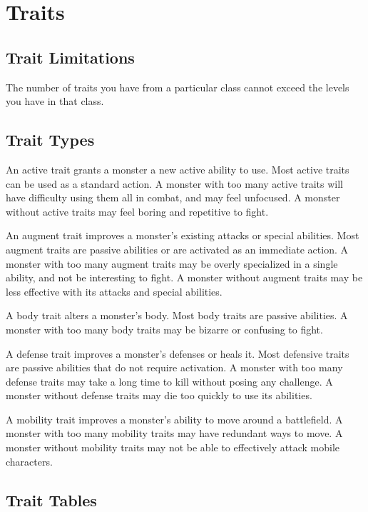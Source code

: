 \chapter{Traits}\label{Traits}

\section{Trait Limitations}
    The number of traits you have from a particular class cannot exceed the levels you have in that class.

\section{Trait Types}

     An active trait grants a monster a new active ability to use. Most active traits can be used as a standard action. A monster with too many active traits will have difficulty using them all in combat, and may feel unfocused. A monster without active traits may feel boring and repetitive to fight.

     An augment trait improves a monster's existing attacks or special abilities. Most augment traits are passive abilities or are activated as an immediate action. A monster with too many augment traits may be overly specialized in a single ability, and not be interesting to fight. A monster without augment traits may be less effective with its attacks and special abilities.

     A body trait alters a monster's body. Most body traits are passive abilities. A monster with too many body traits may be bizarre or confusing to fight.

     A defense trait improves a monster's defenses or heals it. Most defensive traits are passive abilities that do not require activation. A monster with too many defense traits may take a long time to kill without posing any challenge. A monster without defense traits may die too quickly to use its abilities.

     A mobility trait improves a monster's ability to move around a battlefield. A monster with too many mobility traits may have redundant ways to move. A monster without mobility traits may not be able to effectively attack mobile characters.

\section{Trait Tables}
    \onecolumn

